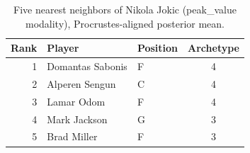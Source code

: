 \begin{table}[htbp]
  \centering\small
  \begin{tabular}{rllc}
    \toprule
    Rank & Player & Position & Archetype \\
    \midrule
    1 & Domantas Sabonis & F & 4 \\
    2 & Alperen Sengun & C & 4 \\
    3 & Lamar Odom & F & 4 \\
    4 & Mark Jackson & G & 3 \\
    5 & Brad Miller & F & 3 \\
    \bottomrule
  \end{tabular}
  \caption{Five nearest neighbors of Nikola Jokic (peak_value modality), Procrustes-aligned posterior mean.}
  \label{tab:Nikola_Jokic_neighbors_peak_value}
\end{table}

